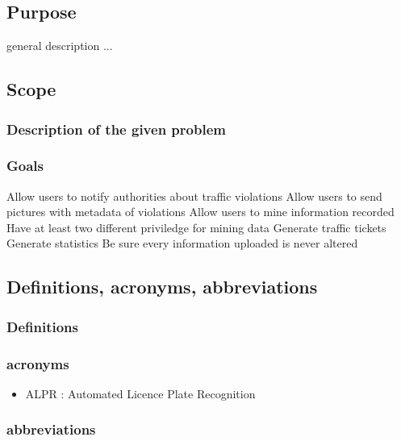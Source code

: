 




\subsection{Purpose}
general description ...

\subsection{Scope}

\subsubsection{Description of the given problem}


\subsubsection{Goals}
\begin{enumerate}
   Allow users to notify authorities about traffic violations
   Allow users to send pictures with metadata of violations
   Allow users to mine information recorded
   Have at least two different  priviledge for mining data
   Generate traffic tickets
   Generate statistics
   Be sure every information uploaded is never altered
\end{enumerate}



\subsection{Definitions,  acronyms,  abbreviations}

\subsubsection{Definitions}
\subsubsection{acronyms}
\begin{itemize}
  \item ALPR : Automated Licence Plate Recognition
\end{itemize}

\subsubsection{abbreviations}


